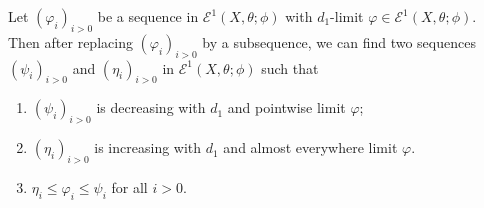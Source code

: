 \begin{lemma}\label{lma:d1conv_inbetween_mono}
    Let $(\varphi_i)_{i>0}$ be a sequence in $\mathcal{E}^1(X,\theta;\phi)$ with $d_1$-limit $\varphi\in \mathcal{E}^1(X,\theta;\phi)$. Then after replacing $(\varphi_i)_{i>0}$ by a subsequence, we can find two sequences $(\psi_i)_{i>0}$ and $(\eta_i)_{i>0}$ in $\mathcal{E}^1(X,\theta;\phi)$ such that
    \begin{enumerate}
        \item\label{itm:lma:d1conv_inbetween_mono:1} $(\psi_i)_{i>0}$ is decreasing with $d_1$ and pointwise limit $\varphi$;
        \item\label{itm:lma:d1conv_inbetween_mono:2} $(\eta_i)_{i>0}$ is increasing with $d_1$ and almost everywhere limit $\varphi$.
        \item\label{itm:lma:d1conv_inbetween_mono:3} $\eta_i\leq \varphi_i\leq \psi_i$ for all $i>0$.
    \end{enumerate}
\end{lemma}
